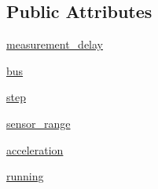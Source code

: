 \subsection*{Public Attributes}
\begin{DoxyCompactItemize}
\item 
\hyperlink{classmma8451_1_1mma8451_a1cc6473d0eefeba3b11461b16a2d64f8}{measurement\+\_\+delay}
\item 
\hyperlink{classmma8451_1_1mma8451_a9fea18df9898f5f4df865a3668c29fbc}{bus}
\item 
\hyperlink{classmma8451_1_1mma8451_a5d0f9139629bb4316b3109e521368876}{step}
\item 
\hyperlink{classmma8451_1_1mma8451_a5051bf544957722f005045e8a16eb2e8}{sensor\+\_\+range}
\item 
\hyperlink{classmma8451_1_1mma8451_a1f58026a28067d044c257616c13ac318}{acceleration}
\item 
\hyperlink{classmma8451_1_1mma8451_abc10252bbf5c1468795d349f3ffcbcb0}{running}
\end{DoxyCompactItemize}
